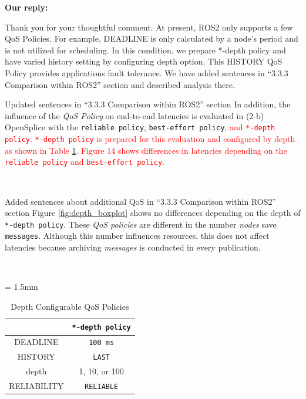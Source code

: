 \documentclass{article}
\begin{document}
\begin{enumerate}
  \begin{flushleft}
    \textbf{Our reply:}
  \end{flushleft}
  Thank you for your thoughtful comment.
  At present, ROS2 only supports a few QoS Policies.
  For example, DEADLINE is only calculated by a node's period and is not utilized for scheduling.
  In this condition, we prepare *-depth policy and have varied history setting by configuring depth option.
  This HISTORY QoS Policy provides applications fault tolerance.
  We have added sentences in ``3.3.3 Comparison within ROS2'' section and described analysis there.
  \begin{itembox}[|]{Updated sentences in ``3.3.3 Comparison within ROS2'' section}
    In addition, the influence of the \emph{QoS Policy} on end-to-end latencies is evaluated in (2-b) OpenSplice with the \texttt{reliable policy}, \texttt{best-effort policy}\textcolor{red}{, and \texttt{*-depth policy}.
      \texttt{*-depth policy} is prepared for this evaluation and configured by depth as shown in Table \ref{tb:depth_qos}.
      Figure 14 shows differences in latencies depending on the \texttt{reliable policy} and \texttt{best-effort policy}.}
  \end{itembox}\\
  \begin{itembox}[|]{Added sentences about additional QoS in ``3.3.3 Comparison within ROS2'' section}
    Figure \ref{fig:depth_boxplot} shows no differences depending on the depth of \texttt{*-depth policy}.
    These \emph{QoS policies} are different in the number \emph{nodes} save \texttt{messages}.
    Although this number influences resources, this does not affect latencies because archiving \emph{messages} is conducted in every publication.
  \end{itembox}\\
  \renewcommand{\arraystretch}{1.0}
  \setcounter{table}{4}
  \begin{table}[H]
    \caption{\label{tb:depth_qos}Depth Configurable QoS Policies}
    \centering
    \tabcolsep = 1.5mm              %
    \begin{tabular}{c|c}
      \hline
      & \textbf{\texttt{*-depth policy} }\\
      \hline
      \hline
      DEADLINE & \texttt{100 ms}\\
      HISTORY & \texttt{LAST}\\
      depth & 1, 10, or 100\\
      RELIABILITY & \texttt{RELIABLE}\\

\end{tabular}
\end{table}
\end{enumerate}
\end{document}
